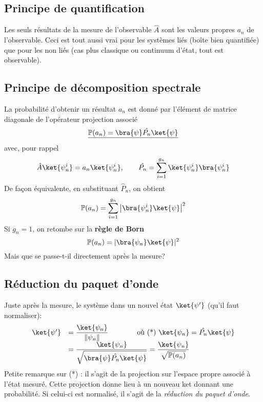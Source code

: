  \subsection{Principe de quantification}
 Les seuls résultats de la mesure de l’observable $\hat{A}$ sont les 
 valeurs propres $a_n$ de l'observable. Ceci est tout aussi vrai pour les 
 systèmes liés (boîte bien quantifiée) que pour les non liés (cas plus classique ou 
 continuum d'état, tout est observable).
 
 \subsection{Principe de décomposition spectrale}
 La probabilité d'obtenir un résultat $a_n$ est donné par l'élément de 
 matrice diagonale de l'opérateur projection associé
 \begin{equation}
 \underline{\mathbb{P}(a_n) = \bra{\psi}\hat{P_n}\ket{\psi}}
 \end{equation}
 avec, pour rappel 
 \begin{equation}
 \hat{A}\ket{\psi_n^i} = a_n\ket{\psi_n^i},\qquad \hat{P_n} = \sum_{i=1}^{g_n} 
 \ket{\psi_n^i}\bra{\psi_n^i}
 \end{equation}
 De façon équivalente, en substituant $\hat{P}_n$, on obtient
 \begin{equation}
 \mathbb{P}(a_n) = \sum_{i=1}^{g_n} \left|\bra{\psi_n^i}\ket{\psi}\right|^2
 \end{equation}
 Si $g_n = 1$, on retombe sur la \textbf{règle de Born}
 \begin{equation}
 \mathbb{P}(a_n) = |\bra{\psi_n}\ket{\psi}|^2
 \end{equation}
 Mais que se passe-t-il directement après la mesure?
 
 \subsection{Réduction du paquet d'onde}
 Juste après la mesure, le système dans un nouvel état $\ket{\psi'}$ (qu'il 
 faut normaliser):
 \begin{equation}
 \begin{array}{ll}
 \ket{\psi'} &= \dfrac{\ket{\psi_n}}{\|\psi_n\|}\qquad\qquad \text{où (*) } \ket{\psi_n} 
 = \hat{P_n}\ket{\psi}\\
 &= \dfrac{\ket{\psi_n}}{\sqrt{\bra{\psi}\hat{P_n}\ket{\psi}}} = \dfrac{\ket{\psi_n}}{
 \sqrt{\mathbb{P}(a_n)}}
 \end{array}
 \end{equation}
 Petite remarque sur (*) : il s'agit de la projection sur l'espace propre associé à 
 l'état mesuré. Cette projection donne lieu à un nouveau ket donnant une probabilité. Si 
 celui-ci est normalisé, il s'agit de la \textit{réduction du paquet d'onde}.\\
 
